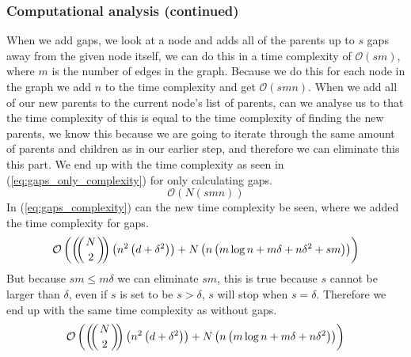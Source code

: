\documentclass{article}
\def\multiset#1#2{\ensuremath{\left(\kern-.3em\left(\genfrac{}{}{0pt}{}{#1}{#2}\right)\kern-.3em\right)}}
\begin{document}
\subsubsection{Computational analysis (continued)}
When we add gaps, we look at a node and adds all of the parents up to $s$ gaps away from the given node itself, we can do this in a time complexity of $\mathcal{O}(s m)$, where $m$ is the number of edges in the graph. Because we do this for each node in the graph we add $n$ to the time complexity and get $\mathcal{O}(s m n)$. When we add all of our new parents to the current node's list of parents, can we analyse us to that the time complexity of this is equal to the time complexity of finding the new parents, we know this because we are going to iterate through the same amount of parents  and children as in our earlier step, and therefore we can eliminate this this part. We end up with the time complexity as seen in (\ref{eq:gaps_only_complexity}) for only calculating gaps.
\begin{equation}
\label{eq:gaps_only_complexity}
\mathcal{O}(N(s m n))
\end{equation}
In (\ref{eq:gaps_complexity}) can the new time complexity be seen, where we added the time complexity for gaps.
\begin{equation}
\label{eq:gaps_complexity}
\mathcal{O}\left(\multiset{N}{2}\left(n^2\left(d+\delta^2\right)\right) + N\left(n\left(m\log n + m\delta + n\delta^2 + sm\right)\right)\right)
\end{equation}
But because $sm \leq m \delta$ we can eliminate $sm$, this is true because $s$ cannot be larger than $\delta$, even if $s$ is set to be $s > \delta$, $s$ will stop when $s = \delta$. Therefore we end up with the same time complexity as without gaps. 
\begin{equation}
\mathcal{O}\left(\multiset{N}{2}\left(n^2\left(d+\delta^2\right)\right) + N\left(n\left(m\log n + m\delta + n\delta^2\right)\right)\right)
\end{equation}
\end{document}
